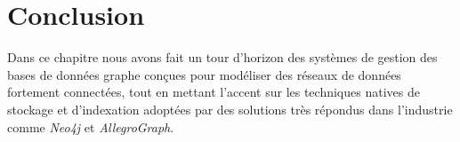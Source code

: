 \section*{Conclusion}
 

Dans ce chapitre nous avons fait un tour d'horizon des systèmes de
gestion des bases de données graphe conçues pour modéliser des
réseaux de données fortement connectées, tout en mettant l'accent sur
les techniques natives de stockage et d'indexation adoptées par des
solutions très répondus dans l'industrie comme \textit{Neo4j} et
\textit{AllegroGraph}.


